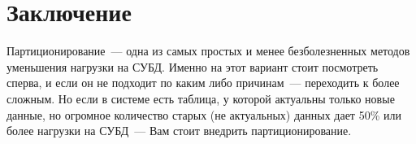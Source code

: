 



\section{Заключение}

Партиционирование~--- одна из самых простых и менее безболезненных методов уменьшения нагрузки на СУБД. Именно на этот вариант стоит посмотреть сперва, и если он не подходит по каким либо причинам~--- переходить к более сложным. Но если в системе есть таблица, у которой актуальны только новые данные, но огромное количество старых (не актуальных) данных дает 50\% или более нагрузки на СУБД~--- Вам стоит внедрить партиционирование.